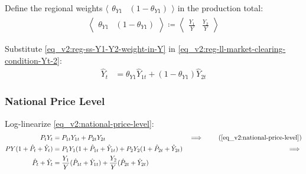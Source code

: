 \documentclass[../thesis.tex]{subfiles}
\begin{document}

Define the regional weights $\langle \begin{smallmatrix} \theta_{Y1} & (1-\theta_{Y1}) \end{smallmatrix} \rangle$ in the production total:
\begin{align}
	\left\langle \begin{matrix} \theta_{Y1} & (1-\theta_{Y1}) \end{matrix} \right\rangle \coloneq \left\langle \begin{matrix} \frac{Y_{1}}{Y} & \frac{Y_{2}}{Y} \end{matrix} \right\rangle \label{eq_v2:reg-ss-Y1-Y2-weight-in-Y}
\end{align}


Substitute \ref{eq_v2:reg-ss-Y1-Y2-weight-in-Y} in \ref{eq_v2:reg-ll-market-clearing-condition-Yt-2}:
\begin{align}
	\hat{Y}_{t} &= \theta_{Y1} \hat{Y}_{1t} + (1-\theta_{Y1}) \hat{Y}_{2t} \label{eq_v2:reg-ll-market-clearing-condition-Yt-3}
\end{align}


\subsubsection*{National Price Level}

Log-linearize \ref{eq_v2:national-price-level}:
\begin{alignat}{2}
	P_{t} Y_{t} &= P_{1t} Y_{1t} + P_{2t} Y_{2t} & \implies \tag{\ref{eq_v2:national-price-level}} \\ 
	P Y (1 + \hat{P}_{t} + \hat{Y}_{t}) &= P_{1} Y_{1} (1 + \hat{P}_{1t} + \hat{Y}_{1t}) + P_{2} Y_{2} (1 + \hat{P}_{2t} + \hat{Y}_{2t}) &\implies \nonumber \\
	\hat{P}_{t} + \hat{Y}_{t} &= \frac{Y_{1}}{Y} (\hat{P}_{1t} + \hat{Y}_{1t}) + \frac{Y_{2}}{Y} (\hat{P}_{2t} + \hat{Y}_{2t}) \label{eq_v2:reg-ll-national-price-level}
\end{alignat}

	
\end{document}
